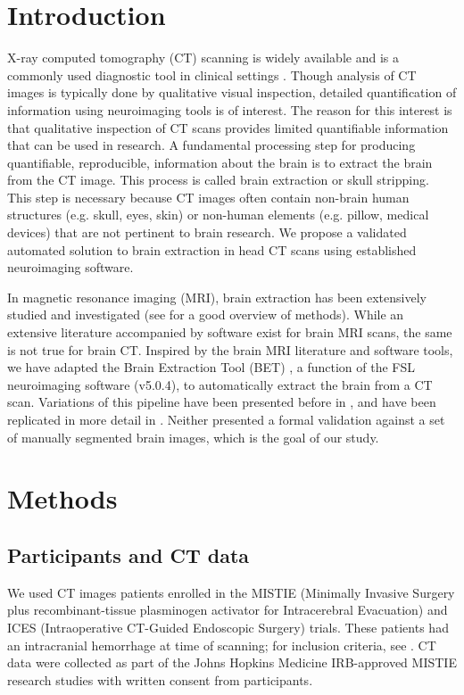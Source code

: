 \documentclass{elsarticle}\usepackage[]{graphicx}\usepackage[]{color}
\begin{document}
\section{Introduction}

X-ray computed tomography (CT) scanning is widely available and is a commonly used diagnostic tool in clinical settings \citep{sahni_management_2007, chalela2007magnetic, schellinger1999standardized}. Though analysis of CT images is typically done by qualitative visual inspection, detailed quantification of information using neuroimaging tools is of interest.  The reason for this interest is that qualitative inspection of CT scans provides limited quantifiable information that can be used in research. A fundamental processing step for producing quantifiable, reproducible, information about the brain is to extract the brain from the CT image. This process is called brain extraction or skull stripping.  This step is necessary because CT images often contain non-brain human structures (e.g. skull, eyes, skin) or non-human elements (e.g. pillow, medical devices) that are not pertinent to brain research.  We propose a validated automated solution to brain extraction in head CT scans using established neuroimaging software.

In magnetic resonance imaging (MRI), brain extraction has been extensively studied and investigated (see \citet{wang2014knowledge} for a good overview of methods).  While an extensive literature accompanied by software exist for brain MRI scans, the same is not true for brain CT.  Inspired by the brain MRI literature and software tools, we have adapted the Brain Extraction Tool (BET) \citep{smith_fast_2002}, a function of the FSL \citep{jenkinson_fsl_2012} neuroimaging software (v5.0.4), to automatically extract the brain from a CT scan.  Variations of this pipeline have been presented before in \citet{able}, and have been replicated in more detail in \citet{rorden_age-specific_2012}.  Neither presented a formal validation against a set of manually segmented brain images, which is the goal of our study. 


\section{Methods}
\subsection{ Participants and CT data}
We used CT images patients enrolled in the MISTIE (Minimally Invasive Surgery plus recombinant-tissue plasminogen activator for Intracerebral Evacuation) and ICES (Intraoperative CT-Guided Endoscopic Surgery) trials.  These patients had an intracranial hemorrhage at time of scanning; for inclusion criteria, see \citet{mould_minimally_2013}. CT data were collected as part of the Johns Hopkins Medicine IRB-approved MISTIE research studies with written consent from participants.  
\end{document}
